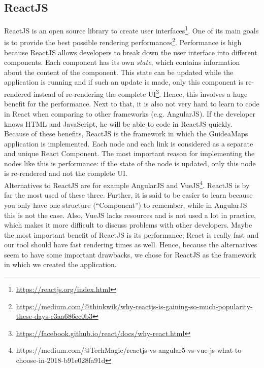 \subsection{ReactJS}\label{sec:reactjs}
ReactJS is an open source library to create user interfaces\footnote{\url{https://reactjs.org/index.html}}. One of its main goals is to provide the best possible rendering performances\footnote{\url{https://medium.com/@thinkwik/why-reactjs-is-gaining-so-much-popularity-these-days-c3aa686ec0b3}}. Performance is high because ReactJS allows developers to break down the user interface into different components. Each component has its own \textit{state}, which contains information about the content of the component. This state can be updated while the application is running and if such an update is made, only this component is re-rendered instead of re-rendering the complete UI\footnote{\url{https://facebook.github.io/react/docs/why-react.html}}. Hence, this involves a huge benefit for the performance. Next to that, it is also not very hard to learn to code in React when comparing to other frameworks (e.g. AngularJS). If the developer knows HTML and JavaScript, he will be able to code in ReactJS quickly.\\

Because of these benefits, ReactJS is the framework in which the GuideaMaps application is implemented. Each node and each link is considered as a separate and unique React Component. The most important reason for implementing the nodes like this is performance: if the state of the node is updated, only this node is re-rendered and not the complete UI.\\

Alternatives to ReactJS are for example AngularJS and VueJS\footnote{https://medium.com/@TechMagic/reactjs-vs-angular5-vs-vue-js-what-to-choose-in-2018-b91e028fa91d}. ReactJS is by far the most used of these three. Further, it is said to be easier to learn because you only have one structure (``Component'') to remember, while in AngularJS this is not the case. Also, VueJS lacks resources and is not used a lot in practice, which makes it more difficult to discuss problems with other developers. Maybe the most important benefit of ReactJS is its performance; React is really fast and our tool should have fast rendering times as well. Hence, because the alternatives seem to have some important drawbacks, we chose for ReactJS as the framework in which we created the application. 


